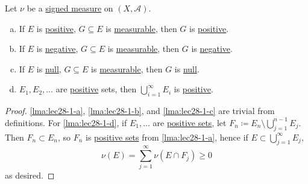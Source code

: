 \begin{lemma}\label{lma:lec28-1}
	Let \(\nu\) be a \hyperref[def:signed-measure]{signed measure} on \((X, \mathcal{A})\).
	\begin{enumerate}[(a)]
		\item\label{lma:lec28-1-a} If \(E\) is \hyperref[def:positive-set]{positive}, \(G \subseteq E\) is \hyperref[def:measurable-set]{measurable}, then \(G\) is \hyperref[def:positive-set]{positive}.
		\item\label{lma:lec28-1-b} If \(E\) is \hyperref[def:negative-set]{negative}, \(G \subseteq E\) is \hyperref[def:measurable-set]{measurable}, then \(G\) is \hyperref[def:negative-set]{negative}.
		\item\label{lma:lec28-1-c} If \(E\) is \hyperref[def:null-set-signed-measure]{null}, \(G \subseteq E\) is \hyperref[def:measurable-set]{measurable}, then \(G\) is \hyperref[def:null-set-signed-measure]{null}.
		\item\label{lma:lec28-1-d} \(E_1,E_2,\dots\) are \hyperref[def:positive-set]{positive} sets, then \(\bigcup_{i=1}^\infty E_i\) is \hyperref[def:positive-set]{positive}.
	\end{enumerate}
\end{lemma}
\begin{proof}
	\autoref{lma:lec28-1-a}, \autoref{lma:lec28-1-b}, and \autoref{lma:lec28-1-c} are trivial from definitions. For \autoref{lma:lec28-1-d}, if \(E_1, \dots \) are \hyperref[def:positive-set]{positive sets}, let \(F_{n} \coloneqq E_n \setminus \bigcup_{j=1}^{n-1} E_j\). Then \(F_n \subset E_n\), so \(F_n\) is \hyperref[def:positive-set]{positive sets} from \autoref{lma:lec28-1-a}, hence if \(E\subset \bigcup_{j=1}^{\infty} E_{j} \),
	\[
		\nu (E) = \sum_{j=1}^{\infty} \nu (E \cap F_{j} )\geq 0
	\]
	as desired.
\end{proof}

